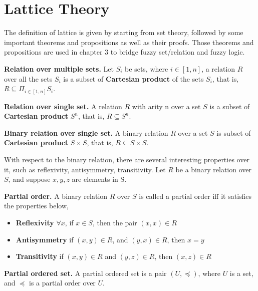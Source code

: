 \section{Lattice Theory}
\label{sec: LatticeTheory}
The definition of lattice is given by starting from set theory, followed by some important theorems and propositions as well as their proofs. Those theorems and propositions are used in chapter 3 to bridge fuzzy set/relation and fuzzy logic.
 
\begin{defin} \textbf{Relation over multiple sets.}
\label{def:ROverMultiSets}
Let $S_i$ be sets, where $i \in [1,n]$, a relation $R$ over all the sets $S_i$ is a subset of \textbf{Cartesian product} of the sets $S_i$, that is, $R \subseteq \Pi_{i \in [1,n]} S_i$.
\end{defin}

\begin{defin} \textbf{Relation over single set.}
\label{def:ROverSingleSet}
A relation $R$ with arity n over a set $S$ is a subset of \textbf{Cartesian product} $S^n$, that is,  $R \subseteq S^n$.
\end{defin}
 
\begin{defin} \textbf{Binary relation over single set.}
\label{def:BinROverSingleSet}
A binary relation $R$ over a set $S$ is subset of \textbf{Cartesian product} $S \times S$, that is,
$R \subseteq S \times S$. 
\end{defin}

With respect to the binary relation, there are several interesting properties over it, such as reflexivity, antisymmetry, transitivity. Let $R$ be a binary relation over $S$, and suppose $x,y,z$ are elements in S. 

\begin{defin} \textbf{Partial order.}
\label{def:PartialOrder}
A binary relation $R$ over $S$ is called a partial order iff it satisfies the properties below,
\begin{itemize}
\item \textbf{Reflexivity} $\forall x$, if $x \in S$, then the pair $(x,x) \in R$
\item \textbf{Antisymmetry} if $(x,y) \in R$, and $(y,x) \in R$, then $x=y$
\item \textbf{Transitivity} if $(x,y) \in R$ and $(y,z) \in R$, then $(x,z) \in R$
\end{itemize}
\end{defin}

\begin{defin} \textbf{Partial ordered set.}
\label{def:PartialOrderSet}
A partial ordered set is a pair $(U,\preceq)$, where $U$ is a set, and $\preceq$ is a partial order over $U$.
\end{defin}

